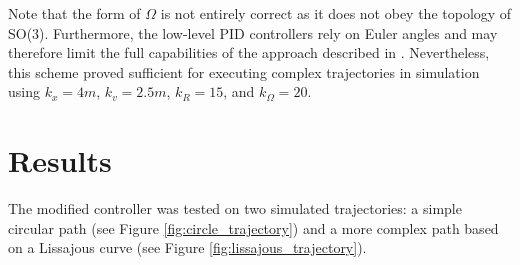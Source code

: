 \documentclass[paper=letter, fontsize=11pt]{scrartcl} %
\numberwithin{equation}{section} %
\numberwithin{figure}{section} %
\numberwithin{table}{section} %
\begin{document}
Note that the form of $\Omega$ is not entirely correct as it does not obey the
topology of SO(3). Furthermore, the low-level PID controllers rely on Euler angles
and may therefore limit the full capabilities of the approach described in
\cite{lee2010geometric}. Nevertheless, this scheme proved sufficient for
executing complex trajectories in simulation using $k_x = 4m$, $k_v = 2.5m$,
$k_R = 15$, and $k_{\Omega} = 20$.

\pagebreak
\section{Results}
The modified controller was tested on two simulated trajectories: a simple circular
path (see Figure \ref{fig:circle_trajectory}) and a more complex path based on a
Lissajous curve (see Figure \ref{fig:lissajous_trajectory}).
\end{document}

